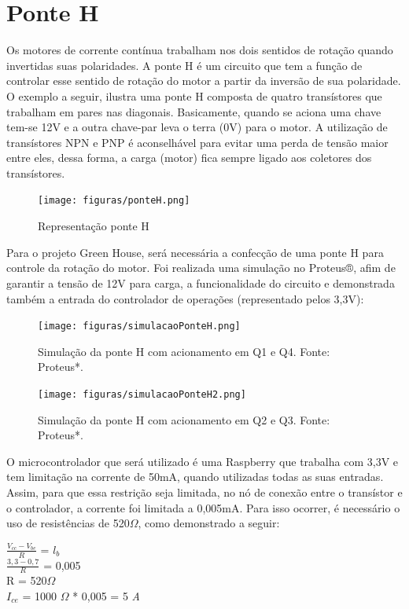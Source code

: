\section{Ponte H}
Os motores de corrente contínua trabalham nos dois sentidos de rotação quando invertidas suas polaridades. A ponte H é um circuito que tem a função de controlar esse sentido de rotação do motor a partir da inversão de sua polaridade. O exemplo a seguir, ilustra uma ponte H composta de quatro transístores que trabalham em pares nas diagonais. Basicamente, quando se aciona uma chave tem-se 12V e a outra chave-par leva o terra (0V) para o motor. A utilização de transístores NPN e PNP é aconselhável para evitar uma perda de tensão maior entre eles, dessa forma, a carga (motor) fica sempre ligado aos coletores dos transístores.     

\begin{figure}[H]
	\centering
	\texttt{[image: figuras/ponteH.png]}
	\caption{Representação ponte H}
	\label{ponte H}
\end{figure}

Para o projeto Green House, será necessária a confecção de uma ponte H para controle da rotação do motor. Foi realizada uma simulação no Proteus®, afim de garantir a tensão de 12V para carga, a funcionalidade do circuito e demonstrada também a entrada do controlador de operações (representado pelos 3,3V):

\begin{figure}[H]
	\centering
	\texttt{[image: figuras/simulacaoPonteH.png]}
	\caption{Simulação da ponte H com acionamento em Q1 e Q4. Fonte: Proteus*.}
	\label{simulação ponte H}
\end{figure}

\begin{figure}[H]
	\centering
	\texttt{[image: figuras/simulacaoPonteH2.png]}
	\caption{Simulação da ponte H com acionamento em Q2 e Q3. Fonte: Proteus*.}
	\label{simulação ponte H 2}
\end{figure}

O microcontrolador que será utilizado é uma Raspberry que trabalha com 3,3V e tem limitação na corrente de 50mA, quando utilizadas todas as suas entradas. Assim, para que essa restrição seja limitada, no nó de conexão entre o transístor e o controlador, a corrente foi limitada a 0,005mA. Para isso ocorrer, é necessário o uso de resistências de 520$\Omega$, como demonstrado a seguir:

\begin{center}
	
$\frac{V_{cc} - V_{be}}{R}$ = $l_{b}$ \\
$\frac{3,3 - 0,7}{R}$ = 0,005\\
R = 520$\Omega$\\
$I_{ce}$ = 1000 $\Omega$ * 0,005 = 5 \textit{A}

\end{center}

